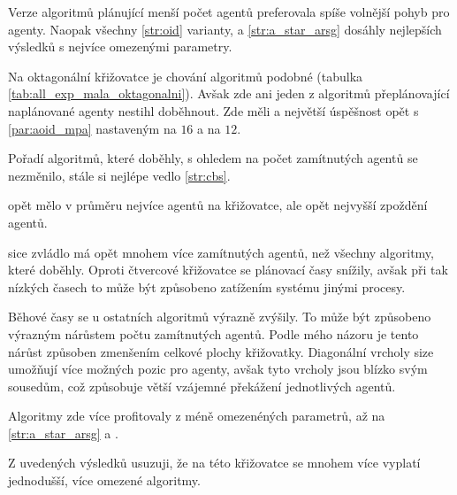 Verze algoritmů plánující menší počet agentů preferovala spíše volnější pohyb pro agenty.
Naopak všechny \ref{str:oid} varianty,  a \ref{str:a_star_arsg} dosáhly nejlepších výsledků s nejvíce omezenými parametry.



Na oktagonální křižovatce je chování algoritmů podobné (tabulka \ref{tab:all_exp_mala_oktagonalni}).
Avšak zde ani jeden z algoritmů přeplánovající naplánované agenty nestihl doběhnout.
Zde měli  a 
největší úspěšnost opět s \ref{par:aoid_mpa} nastaveným na $16$ a  na $12$.

Pořadí algoritmů, které doběhly, s ohledem na počet zamítnutých agentů se nezměnilo,
stále si nejlépe vedlo \ref{str:cbs}.

 opět mělo v průměru nejvíce agentů na křižovatce, ale opět nejvyšší zpoždění agentů.

 sice zvládlo má opět mnohem více zamítnutých agentů, než všechny algoritmy, které doběhly.
Oproti čtvercové křižovatce se plánovací časy snížily,
avšak při tak nízkých časech to může být způsobeno zatížením systému jinými procesy.

Běhové časy se u ostatních algoritmů výrazně zvýšily.
To může být způsobeno výrazným nárůstem počtu zamítnutých agentů.
Podle mého názoru je tento nárůst způsoben zmenšením celkové plochy křižovatky.
Diagonální vrcholy size umožňují více možných pozic pro agenty,
avšak tyto vrcholy jsou blízko svým sousedům, což způsobuje větší vzájemné překážení jednotlivých agentů.

Algoritmy zde více profitovaly z méně omezenéných parametrů, až na \ref{str:a_star_arsg} a .






Z uvedených výsledků usuzuji, že na této křižovatce se mnohem více vyplatí jednodušší, více omezené algoritmy.








